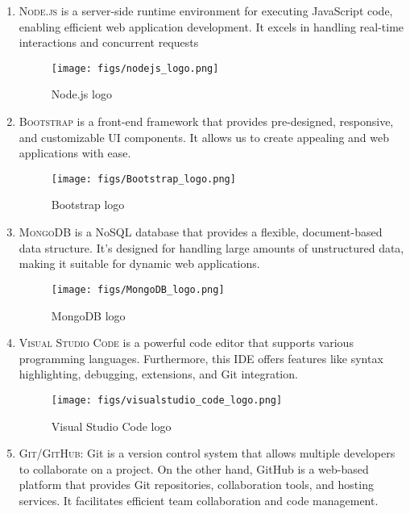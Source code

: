 \documentclass[conference]{IEEEtran}
\begin{document}
\begin{enumerate}
    \item \textsc{Node.js} is a server-side runtime environment for executing JavaScript code, enabling efficient web application development. It excels in handling real-time interactions and concurrent requests
        \begin{figure}[H]
        \centering
        \texttt{[image: figs/nodejs\_logo.png]}
        \caption{Node.js logo}
        \label{fig:Node.js logo}
        \end{figure}
    \item \textsc{Bootstrap} is a front-end framework that provides pre-designed, responsive, and customizable UI components. It allows us to create appealing and web applications with ease.
        \begin{figure}[H]
        \centering
        \texttt{[image: figs/Bootstrap\_logo.png]}
        \caption{Bootstrap logo}
        \label{fig:Bootstrap logo}
        \end{figure}
    \item \textsc{MongoDB} is a NoSQL database that provides a flexible, document-based data structure. It's designed for handling large amounts of unstructured data, making it suitable for dynamic web applications.
        \begin{figure}[H]
        \centering
        \texttt{[image: figs/MongoDB\_logo.png]}
        \caption{MongoDB logo}
        \label{fig:MongoDB logo}
        \end{figure}
    \item \textsc{Visual Studio Code} is a powerful code editor that supports various programming languages. Furthermore, this IDE offers features like syntax highlighting, debugging, extensions, and Git integration.
        \begin{figure}[H]
        \centering
        \texttt{[image: figs/visualstudio\_code\_logo.png]}
        \caption{Visual Studio Code logo}
        \label{fig:Visual Studio Code logo}
        \end{figure}
    \item \textsc{Git/GitHub}: Git is a version control system that allows multiple developers to collaborate on a project. On the other hand, GitHub is a web-based platform that provides Git repositories, collaboration tools, and hosting services. It facilitates efficient team collaboration and code management.
        \begin{figure}[H]
        \centering

\end{figure}
\end{enumerate}
\end{document}
